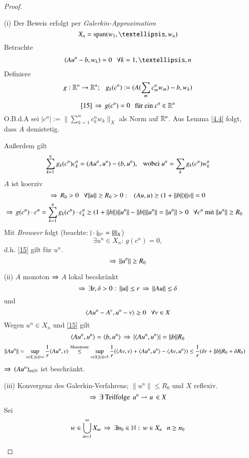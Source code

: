 \begin{proof}
    \begin{description}
    \item{(i)}
    Der Beweis erfolgt per \textit{Galerkin-Approximation}
    \[
        X_n=\mr{span}(w_1,…,w_n)
    \]
    Betrachte
    \begin{align}\label{15}
        (Au^n-b,w_k)=0 \qq \forall k=1,…,n
    \end{align}
    Definiere
    \[
        g:\mathbb{R}^n\rightarrow \mathbb{R}^n; \hspace{.25cm} g_k(c^n):= (A(\sum_mc_m^nw_m)-b,w_k)
    \]
    \[
        \ref{15} \, \Rightarrow \, g(c^n)=0 \hspace{.25cm} \text{für ein } c^n\in\mathbb{R}^n  
    \]
    O.B.d.A sei $|c^n|:= \|\sum_{k=1}^n c^n_kw_k\|_X$ als Norm auf $\mathbb{R}^n$. Aus Lemma \ref{4.4} folgt,
    dass $A$ demistetig. 

    Außerdem gilt
    \[
        \sum_{k=1}^n g_k(c^n)c^n_k=(Au^n,u^n)-(b,u^n), \hspace{.25cm} \text{wobei } u^n=\sum_kg_k(c^n)w_k^n
    \]
    $A$ ist koerziv
    \[
        \Rightarrow \, R_0>0 \hspace{.25cm} \forall \|u\|\geq R_0>0: \hspace{.25cm} (Au,u)\geq (1+\|b\|)\|v\| =0
    \]
    \begin{align*}
        \Ra \, g(c^n)\cdot c^n &= \sum_{k=1}^ng_k(c^n)\cdot c_k^n \geq (1+\|b\|)\|u^n\| - \|b\|\|u^n\|
        =\|u^n\|>0 \qq \forall c^n \text{ mit } \|u^n\|\geq R_0
    \end{align*}
    Mit \textit{Brouwer} folgt (beachte: $|\cdot|_{\mathbb{R}^n}=\|\|_X$)
    \[
        \exists u^n\in X_n: \, g(c^n)=0,
    \]
    d.h. \ref{15} gilt für $u^n$.
    \[
        \Rightarrow \, \|u^n\|\geq R_0
    \]
    \item{(ii)}
    $A$ monoton $\Rightarrow$ $A$ lokal becshränkt
    \[
        \Rightarrow \, \exists r,\delta>0: \, \|u\|\leq r \, \Rightarrow \, \|Au\|\leq \delta
    \]
    und
    \[
        \langle Au^n-A^v,u^n-v\rangle\geq 0 \hspace{.25cm} \forall v\in X
    \]
    Wegen $u^n\in X_n$ und \ref{15} gilt
    \[
        \langle Au^n,u^n\rangle=\langle b,u^n\rangle\, \Rightarrow \, |\langle Au^n,u^n\rangle|=\|b\|R_0
    \]
    \begin{align*}
        \|Au^n\|&= \sup_{v\in X, \, \|v\|=r} \frac1r\langle Au^n,v\rangle \overset{\text{Monotonie}}{\leq} 
        \sup_{v\in X, \|v\|=5} \frac1r (\langle Av,v\rangle+\langle Au^n,u^n\rangle-\langle Av,u^n\rangle)
        \leq \frac1r (\delta r+ \|b\|R_0 +\delta R_0)
    \end{align*}
    $\Rightarrow $ $(Au^n)_{n\in \mathbb{N}}$ ist beschränkt.
    \item{(iii)}
    Konvergenz des Galerkin-Verfahrens; $\|u^n\|\leq R_0$ und $X$ reflexiv.
    \[
        \Rightarrow \, \exists \text{ Teilfolge } \, u^n\rightharpoonup u \,\in X
    \]
    Sei 
    \[
        w\in \bigcup_{m=1}^\infty X_m \, \Rightarrow \, \exists n_0\in\mathbb{N}: \, w\in X_n\hspace{.25cm} n\geq n_0
\]
\end{description}
\end{proof}

